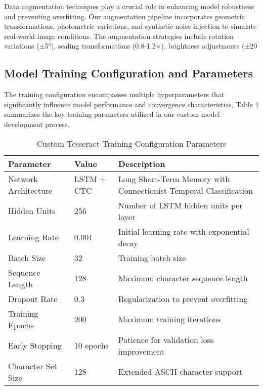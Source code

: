 Data augmentation techniques play a crucial role in enhancing model robustness and preventing overfitting. Our augmentation pipeline incorporates geometric transformations, photometric variations, and synthetic noise injection to simulate real-world image conditions. The augmentation strategies include rotation variations (±5°), scaling transformations (0.8-1.2×), brightness adjustments (±20%


\subsection{Model Training Configuration and Parameters}

The training configuration encompasses multiple hyperparameters that significantly influence model performance and convergence characteristics. Table \ref{tab:training_config} summarizes the key training parameters utilized in our custom model development process.

\begin{table}[H]
\centering
\caption{Custom Tesseract Training Configuration Parameters}
\label{tab:training_config}
\begin{tabular}{|l|l|p{6cm}|}
\hline
\textbf{Parameter} & \textbf{Value} & \textbf{Description} \\
\hline
Network Architecture & LSTM + CTC & Long Short-Term Memory with Connectionist Temporal Classification \\
\hline
Hidden Units & 256 & Number of LSTM hidden units per layer \\
\hline
Learning Rate & 0.001 & Initial learning rate with exponential decay \\
\hline
Batch Size & 32 & Training batch size \\
\hline
Sequence Length & 128 & Maximum character sequence length \\
\hline
Dropout Rate & 0.3 & Regularization to prevent overfitting \\
\hline
Training Epochs & 200 & Maximum training iterations \\
\hline
Early Stopping & 10 epochs & Patience for validation loss improvement \\
\hline
Character Set Size & 128 & Extended ASCII character support \\
\hline
\end{tabular}
\end{table}

